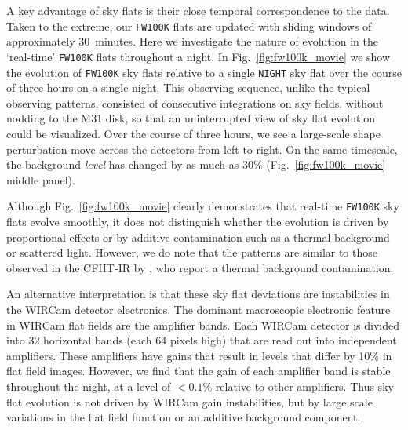 \documentclass[iop]{emulateapj}
\newcommand{\Fig}[1]{Fig.~\ref{fig:#1}}  %
\begin{document}
A key advantage of sky flats is their close temporal correspondence to the data.
Taken to the extreme, our \texttt{FW100K} flats are updated with sliding windows of approximately 30~minutes.
Here we investigate the nature of evolution in the `real-time' \texttt{FW100K} flats throughout a night.
In \Fig{fw100k_movie} we show the evolution of \texttt{FW100K} sky flats relative to a single \texttt{NIGHT} sky flat over the course of three hours on a single night.
This observing sequence, unlike the typical observing patterns, consisted of consecutive integrations on sky fields, without nodding to the M31 disk, so that an uninterrupted view of sky flat evolution could be visualized.
Over the course of three hours, we see a large-scale shape perturbation move across the detectors from left to right.
On the same timescale, the background \emph{level} has changed by as much as 30\% (\Fig{fw100k_movie} middle panel).

Although \Fig{fw100k_movie} clearly demonstrates that real-time \texttt{FW100K} sky flats evolve smoothly, it does not distinguish whether the evolution is driven by proportional effects or by additive contamination such as a thermal background or scattered light.
However, we do note that the patterns are similar to those observed in the CFHT-IR by \cite{Vaduvescu:2004}, who report a thermal background contamination.



An alternative interpretation is that these sky flat deviations are instabilities in the WIRCam detector electronics.
The dominant macroscopic electronic feature in WIRCam flat fields are the amplifier bands.
Each WIRCam detector is divided into 32 horizontal bands (each 64 pixels high) that are read out into independent amplifiers.
These amplifiers have gains that result in levels that differ by 10\% in flat field images.
However, we find that the gain of each amplifier band is stable throughout the night, at a level of $<0.1\%$ relative to other amplifiers.
Thus sky flat evolution is not driven by WIRCam gain instabilities, but by large scale variations in the flat field function or an additive background component.
\end{document}
